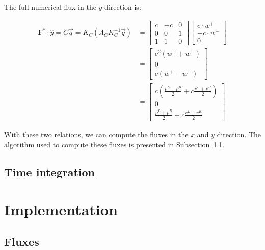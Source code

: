 The full numerical flux in the $y$ direction is:

\begin{equation} \label{equ:numerical_flux_y}
    \begin{split}
        \mathbf{F}^* \cdot \widehat{y} = C \overrightarrow{q} = K_C \left( \Lambda_C K_C^{-1} \overrightarrow{q} \right) & = 
        \begin{bmatrix}
            c & -c & 0 \\ 
            0 & 0 & 1 \\ 
            1 & 1  & 0
        \end{bmatrix}
        \begin{bmatrix}
            c \cdot w^+ \\ 
            -c \cdot w^- \\ 
            0
        \end{bmatrix} \\ 
        & = \begin{bmatrix}
            c^2 \left( w^+ + w^- \right) \\ 
            0 \\ 
            c \left( w^+ - w^- \right)
        \end{bmatrix} \\
        & = \begin{bmatrix}
            c \left( \frac{p^L - p^R}{2} + c \frac{v^L + v^R}{2} \right) \\ 
            0 \\ 
            \frac{p^L + p^R}{2} + c \frac{v^L - v^R}{2}
        \end{bmatrix}
    \end{split}
\end{equation}

With these two relations, we can compute the fluxes in the $x$ and $y$ direction. The algorithm used
to compute these fluxes is presented in
Subsection~\ref{section:spectral_element_method:implementation:fluxes}.

\subsection{Time integration} \label{section:spectral_element_method:spectral_approximation:dg_sem:time}

\section{Implementation} \label{section:spectral_element_method:implementation}

\subsection{Fluxes} \label{section:spectral_element_method:implementation:fluxes}
